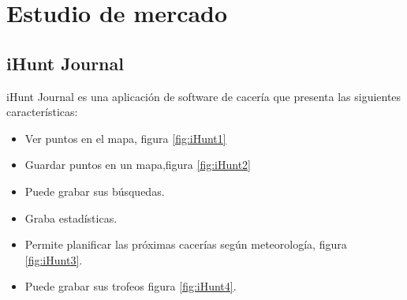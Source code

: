 \section{Estudio de mercado}
\subsection{iHunt Journal}

iHunt Journal es una aplicación de software de cacería que presenta las siguientes características: 
\begin{itemize}
\item Ver puntos en el mapa, figura \ref{fig:iHunt1}
\item Guardar puntos en un mapa,figura \ref{fig:iHunt2}
\item Puede grabar sus búsquedas.
\item Graba  estadísticas.
\item Permite planificar las próximas cacerías según meteorología, figura \ref{fig:iHunt3}.
\item Puede grabar sus trofeos figura \ref{fig:iHunt4}.

\end{itemize}

